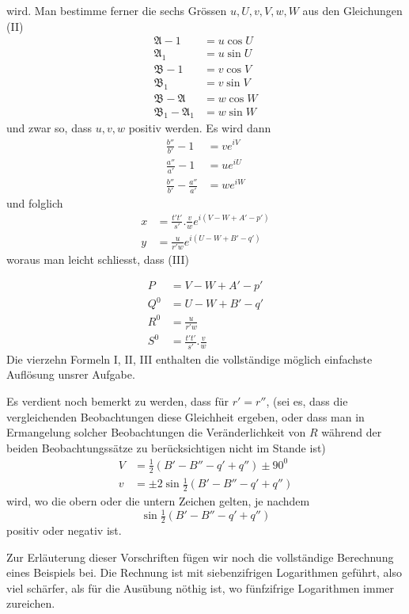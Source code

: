 wird. Man bestimme ferner die sechs Grössen $u,U,v,V,w,W$ aus den Gleichungen (II)
\[
\begin{aligned}
\mathfrak{A}-1&=u\cos U\\
\mathfrak{A}_1&=u\sin U\\
\mathfrak{B}-1&=v\cos V\\
\mathfrak{B}_1&=v\sin V\\
\mathfrak{B}-\mathfrak{A}&=w\cos W\\
\mathfrak{B}_1-\mathfrak{A}_1&=w\sin W
\end{aligned}
\]
und zwar so, dass $u,v,w$ positiv werden. Es wird dann
\[
\begin{aligned}
\frac{b''}{b'}-1&=ve^{iV}\\
\frac{a''}{a'}-1&=ue^{iU}\\
\frac{b''}{b'}-\frac{a''}{a'}&=we^{iW}
\end{aligned}
\]
und folglich
\[
\begin{aligned}
x&=\frac{t't'}{s'}.\frac{v}{w}e^{i(V-W+A'-p')}\\
y&=\frac{u}{r'w}e^{i(U-W+B'-q')}
\end{aligned}
\]
woraus man leicht schliesst, dass (III)
\par\clearpage
{}
\[
\begin{aligned}
P&=V-W+A'-p'\\
Q^0&=U-W+B'-q'\\
R^0&=\frac{u}{r'w}\\
S^0&=\frac{t't'}{s'}.\frac{v}{w}
\end{aligned}
\]
Die vierzehn Formeln I, II, III enthalten die vollständige möglich einfachste Auflösung unsrer Aufgabe.

Es verdient noch bemerkt zu werden, dass für $r'=r''$, (sei es, dass die vergleichenden Beobachtungen diese Gleichheit ergeben, oder dass man in Ermangelung solcher Beobachtungen die Veränderlichkeit von $R$ während der beiden Beobachtungssätze zu berücksichtigen nicht im Stande ist)
\[
\begin{aligned}
V&=\tfrac12(B'-B''-q'+q'')\pm90^0\\
v&=\pm2\sin\tfrac12(B'-B''-q'+q'')
\end{aligned}
\]
wird, wo die obern oder die untern Zeichen gelten, je nachdem
\[
\sin\tfrac12(B'-B''-q'+q'')
\]
positiv oder negativ ist.

Zur Erläuterung dieser Vorschriften fügen wir noch die vollständige Berechnung eines Beispiels bei. Die Rechnung ist mit siebenzifrigen Logarithmen geführt, also viel schärfer, als für die Ausübung nöthig ist, wo fünfzifrige Logarithmen immer zureichen.

